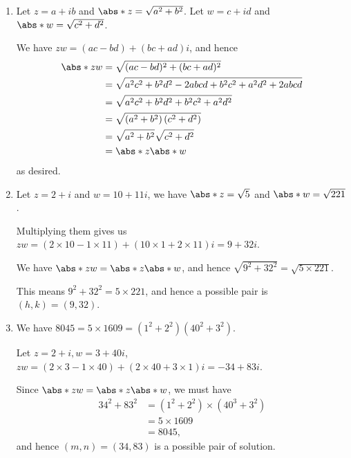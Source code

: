 \Question{\currfilebase}

\begin{enumerate}
    \item Let \(z = a + ib\) and \(\abs*{z} = \sqrt{a^2 + b^2}\). Let \(w = c + id\) and \(\abs*{w} = \sqrt{c^2 + d^2}\).

          We have \(zw = (ac - bd) + (bc + ad) i\), and hence
          \begin{align*}
              \abs*{zw} & = \sqrt{(ac - bd)^2 + (bc + ad)^2}                             \\
                        & = \sqrt{a^2 c^2 + b^2 d^2 - 2abcd + b^2 c^2 + a^2 d^2 + 2abcd} \\
                        & = \sqrt{a^2 c^2 + b^2 d^2 + b^2 c^2 + a^2 d^2}                 \\
                        & = \sqrt{\left(a^2 + b^2\right) \left(c^2 + d^2\right)}         \\
                        & = \sqrt{a^2 + b^2} \sqrt{c^2 + d^2}                            \\
                        & = \abs*{z} \abs*{w}
          \end{align*}
          as desired.

    \item Let \(z = 2 + i\) and \(w = 10 + 11i\), we have \(\abs*{z} = \sqrt{5}\) and \(\abs*{w} = \sqrt{221}\).

          Multiplying them gives us \(zw = (2 \times 10 - 1 \times 11) + (10 \times 1 + 2 \times 11) i = 9 + 32 i\).

          We have \(\abs*{zw} = \abs*{z} \abs*{w}\), and hence \(\sqrt{9^2 + 32^2} = \sqrt{5 \times 221}\).

          This means \(9^2 + 32^2 = 5 \times 221\), and hence a possible pair is \((h, k) = (9, 32)\).

    \item We have \(8045 = 5 \times 1609 = \left(1^2 + 2^2\right) \left(40^2 + 3^2 \right)\).

          Let \(z = 2 + i, w = 3 + 40 i\), \(zw = (2 \times 3 - 1 \times 40) + (2 \times 40 + 3 \times 1) i = -34 + 83i\).

          Since \(\abs*{zw} = \abs*{z} \abs*{w}\), we must have
          \begin{align*}
              34^2 + 83^2 & = \left(1^2 + 2^2\right) \times \left(40^3 + 3^2\right) \\
                          & = 5 \times 1609                                         \\
                          & = 8045,
          \end{align*}
          and hence \((m, n) = (34, 83)\) is a possible pair of solution.


\end{enumerate}
